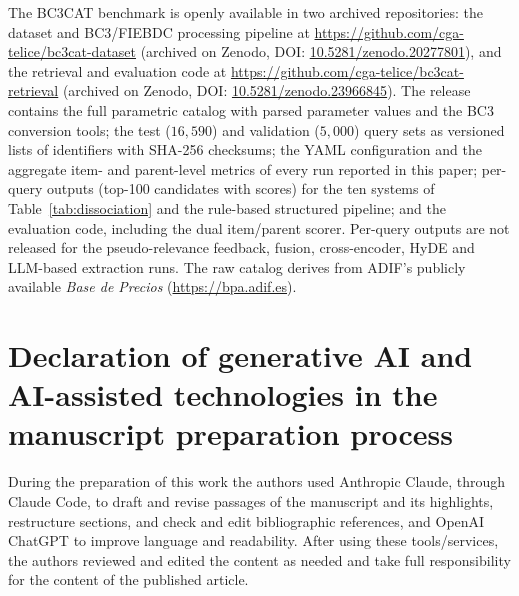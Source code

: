 \documentclass[preprint,review,12pt]{elsarticle}
\begin{document}
The BC3CAT benchmark is openly available in two archived repositories: the dataset and BC3/FIEBDC processing pipeline at \url{https://github.com/cga-telice/bc3cat-dataset} (archived on Zenodo, DOI: \href{https://doi.org/10.5281/zenodo.20277801}{10.5281/zenodo.20277801}), and the retrieval and evaluation code at \url{https://github.com/cga-telice/bc3cat-retrieval} (archived on Zenodo, DOI: \href{https://doi.org/10.5281/zenodo.23966845}{10.5281/zenodo.23966845}). The release contains the full parametric catalog with parsed parameter values and the BC3 conversion tools; the test ($16{,}590$) and validation ($5{,}000$) query sets as versioned lists of identifiers with SHA-256 checksums; the YAML configuration and the aggregate item- and parent-level metrics of every run reported in this paper; per-query outputs (top-100 candidates with scores) for the ten systems of Table~\ref{tab:dissociation} and the rule-based structured pipeline; and the evaluation code, including the dual item/parent scorer. Per-query outputs are not released for the pseudo-relevance feedback, fusion, cross-encoder, HyDE and LLM-based extraction runs. The raw catalog derives from ADIF's publicly available \textit{Base de Precios} (\url{https://bpa.adif.es}).

\section*{Declaration of generative AI and AI-assisted technologies in the manuscript preparation process}

During the preparation of this work the authors used Anthropic Claude, through Claude Code, to draft and revise passages of
the manuscript and its highlights, restructure sections, and check and edit bibliographic
references, and OpenAI ChatGPT to improve language and readability.
After using these tools/services, the authors reviewed and edited the content as
needed and take full responsibility for the content of the published article.
 

\end{document}
